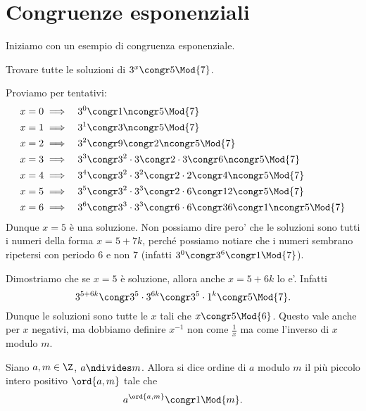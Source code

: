 
\section{Congruenze esponenziali}

Iniziamo con un esempio di congruenza esponenziale.
\begin{example}
    Trovare tutte le soluzioni di $3^x \congr 5 \Mod{7}$.

    Proviamo per tentativi:
    \begin{alignat*}
        {2}
        &x = 0 \implies &&3^0 \congr 1 \ncongr 5 \Mod{7}\\
        &x = 1 \implies &&3^1 \congr 3 \ncongr 5 \Mod{7}\\
        &x = 2 \implies &&3^2 \congr 9 \congr 2 \ncongr 5 \Mod{7}\\
        &x = 3 \implies &&3^3 \congr 3^2 \cdot 3 \congr 2 \cdot 3 \congr 6 \ncongr 5 \Mod{7}\\
        &x = 4 \implies &&3^4 \congr 3^2 \cdot 3^2 \congr 2 \cdot 2 \congr 4 \ncongr 5 \Mod{7}\\
        &x = 5 \implies &&3^5 \congr 3^2 \cdot 3^3 \congr 2 \cdot 6 \congr 12 \congr 5 \Mod{7}\\
        &x = 6 \implies &&3^6 \congr 3^3 \cdot 3^3 \congr 6 \cdot 6 \congr 36 \congr 1 \ncongr 5 \Mod{7}
    \end{alignat*}
    Dunque $x = 5$ è una soluzione. Non possiamo dire pero' che le soluzioni sono tutti i numeri della forma $x = 5 + 7k$, perché possiamo notiare che i numeri sembrano ripetersi con periodo $6$ e non $7$ (infatti $3^0 \congr 3^6 \congr 1 \Mod{7}$). 

    Dimostriamo che se $x = 5$ è soluzione, allora anche $x = 5 +6k$ lo e'. Infatti \[
        3^{5 + 6k} \congr 3^5 \cdot 3^{6k} \congr 3^5 \cdot 1^k \congr 5 \Mod{7}.
    \]
    Dunque le soluzioni sono tutte le $x$ tali che $x \congr 5 \Mod{6}$. Questo vale anche per $x$ negativi, ma dobbiamo definire $x^{-1}$ non come $\frac{1}{x}$ ma come l'inverso di $x$ modulo $m$.
\end{example}

\begin{definition}
    Siano $a, m \in \Z$, $a \ndivides m$. Allora si dice ordine di $a$ modulo $m$ il più piccolo intero positivo $\ord{a, m}$ tale che \begin{equation}
        a^{\ord{a, m}} \congr 1 \Mod{m}.
    \end{equation}
\end{definition}

